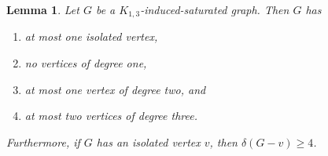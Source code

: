 \documentclass[12pt]{amsart}
\theoremstyle{plain}
\newtheorem{lem}[thm]{Lemma}
\theoremstyle{definition}
\theoremstyle{remark}
\newcommand{\claw}{\ensuremath{K_{1,3}}\xspace}
\begin{document}
\begin{lem}\label{lem:sis_clawdeg}\label{deg2}
Let $G$ be a \claw-induced-saturated graph. Then $G$ has
\begin{enumerate}
\item at most one isolated vertex,
\item no vertices of degree one,
\item at most one vertex of degree two, and
\item at most two vertices of degree three.
\end{enumerate}
Furthermore, if $G$ has an isolated vertex $v$, then $\delta(G-v)\geq4$.
\iftoggle{sub}{}{
Additionally, if $G$ has a vertex of degree three, then $G$ does not have a vertex of degree two.
If $G$ has two vertices of degree three or a vertex of degree two, then $G$ has a vertex of degree at least five.
}
\end{lem}
\end{document}
